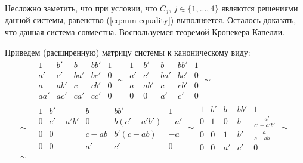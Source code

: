 \documentclass[12pt, a4paper]{extarticle}
\begin{document}
\begin{enumerate}
        Несложно заметить, что при условии, что $C_j$, $j \in \{1, ..., 4\}$ являются решениями
        данной системы, равенство (\ref{eq:mm-equality}) выполняется. Осталось доказать, что данная
        система совместна. Воспользуемся теоремой Кронекера-Капелли.
        
        Приведем (расширенную) матрицу системы к каноническому виду:
        \begin{equation}
        \begin{split}
            & 
            \begin{array}{||cccc|c||}
                1    & b'   & b    & b b' & 1 \\
                a'   & c'   & b a' & b c' & 0 \\
                a    & a b' & c    & c b' & 0 \\
                a a' & a c' & c a' & c c' & 0
            \end{array}
            \sim
            \begin{array}{||cccc|c||}
                1  & b'   & b    & b b' & 1 \\
                a' & c'   & b a' & b c' & 0 \\
                a  & a b' & c    & c b' & 0 \\
                0  & 0    & a'   & c'   & 0
            \end{array}
            \sim \\ \sim\ &
            \begin{array}{||cccc|c||}
                1 & b'         & b      & b b'           & 1   \\
                0 & c' - a' b' & 0      & b (c' - a' b') & -a' \\
                0 & 0          & c - ab & b' (c - ab)    & -a  \\
                0 & 0          & a'     & c'             & 0
            \end{array}
            \sim
            \begin{array}{||cccc|c||}
                1 & b' & b  & b b' & 1                      \\
                0 & 1  & 0  & b    & \frac{-a'}{c' - a' b'} \\
                0 & 0  & 1  & b'   & \frac{-a}{c - ab}      \\
                0 & 0  & a' & c'   & 0
            \end{array}
            \sim \\ \sim\ &

\end{split}
\end{equation}
\end{enumerate}
\end{document}
